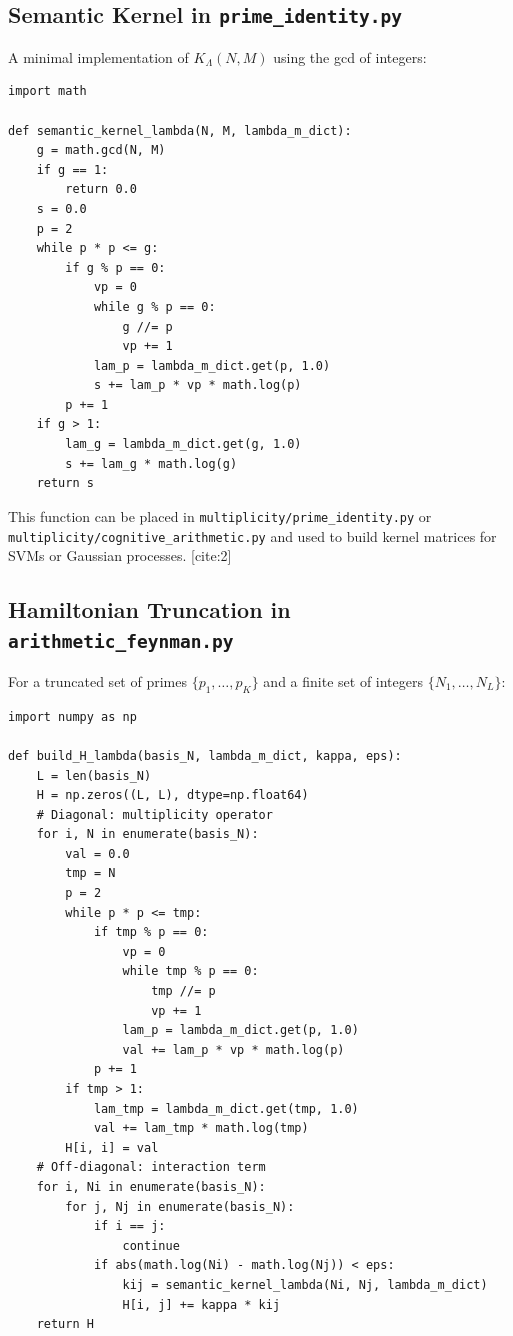 \documentclass[11pt]{article}
\begin{document}
\subsection{Semantic Kernel in \texttt{prime\_identity.py}}

A minimal implementation of $K_{\Lambda}(N,M)$ using the gcd of
integers:

\begin{verbatim}
import math

def semantic_kernel_lambda(N, M, lambda_m_dict):
    g = math.gcd(N, M)
    if g == 1:
        return 0.0
    s = 0.0
    p = 2
    while p * p <= g:
        if g % p == 0:
            vp = 0
            while g % p == 0:
                g //= p
                vp += 1
            lam_p = lambda_m_dict.get(p, 1.0)
            s += lam_p * vp * math.log(p)
        p += 1
    if g > 1:
        lam_g = lambda_m_dict.get(g, 1.0)
        s += lam_g * math.log(g)
    return s
\end{verbatim}

This function can be placed in \texttt{multiplicity/prime\_identity.py}
or \texttt{multiplicity/cognitive\_arithmetic.py} and used to build
kernel matrices for SVMs or Gaussian processes. [cite:2]

\subsection{Hamiltonian Truncation in \texttt{arithmetic\_feynman.py}}

For a truncated set of primes $\{p_1,\dots,p_K\}$ and a finite set
of integers $\{N_1,\dots,N_L\}$:

\begin{verbatim}
import numpy as np

def build_H_lambda(basis_N, lambda_m_dict, kappa, eps):
    L = len(basis_N)
    H = np.zeros((L, L), dtype=np.float64)
    # Diagonal: multiplicity operator
    for i, N in enumerate(basis_N):
        val = 0.0
        tmp = N
        p = 2
        while p * p <= tmp:
            if tmp % p == 0:
                vp = 0
                while tmp % p == 0:
                    tmp //= p
                    vp += 1
                lam_p = lambda_m_dict.get(p, 1.0)
                val += lam_p * vp * math.log(p)
            p += 1
        if tmp > 1:
            lam_tmp = lambda_m_dict.get(tmp, 1.0)
            val += lam_tmp * math.log(tmp)
        H[i, i] = val
    # Off-diagonal: interaction term
    for i, Ni in enumerate(basis_N):
        for j, Nj in enumerate(basis_N):
            if i == j:
                continue
            if abs(math.log(Ni) - math.log(Nj)) < eps:
                kij = semantic_kernel_lambda(Ni, Nj, lambda_m_dict)
                H[i, j] += kappa * kij
    return H
\end{verbatim}
\end{document}
